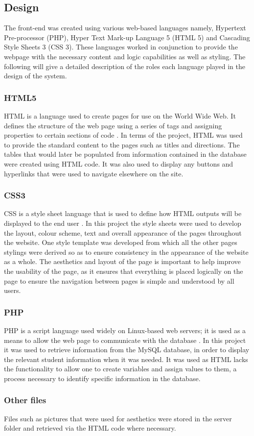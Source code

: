 \documentclass[journal]{IEEEtran}
\begin{document}
\subsection{Design}
The front-end was created using various web-based languages namely, Hypertext Pre-processor (PHP), Hyper Text Mark-up Language 5 (HTML 5) and Cascading Style Sheets 3 (CSS 3). These languages worked in conjunction to provide the webpage with the necessary content and logic capabilities as well as styling. The following will give a detailed description of the roles each language played in the design of the system.
\hfill \break \subsubsection{HTML5} 
HTML is a language used to create pages for use on the World Wide Web. It defines the structure of the web page using a series of tags and assigning properties to certain sections of code \cite{html}. In terms of the project, HTML was used to provide the standard content to the pages such as titles and directions. The tables that would later be populated from information contained in the database were created using HTML code. It was also used to display any buttons and hyperlinks that were used to navigate elsewhere on the site.
\hfill \break \subsubsection{CSS3}
CSS is a style sheet language that is used to define how HTML outputs will be displayed to the end user \cite{css}.  In this project the style sheets were used to develop the layout, colour scheme, text and overall appearance of the pages throughout the website. One style template was developed from which all the other pages stylings were derived so as to ensure consistency in the appearance of the website as a whole. The aesthetics and layout of the page is important to help improve the usability of the page, as it ensures that everything is placed logically on the page to ensure the navigation between pages is simple and understood by all users.
\hfill \break \subsubsection{PHP}
PHP is a script language used widely on Linux-based web servers; it is used as a means to allow the web page to communicate with the database \cite{php}. In this project it was used to retrieve information from the MySQL database, in order to display the relevant student information when it was needed. It was used as HTML lacks the functionality to allow one to create variables and assign values to them, a process necessary to identify specific information in the database.
\hfill \break \subsubsection{Other files}
Files such as pictures that were used for aesthetics were stored in the server folder and retrieved via the HTML code where necessary.
\end{document}
